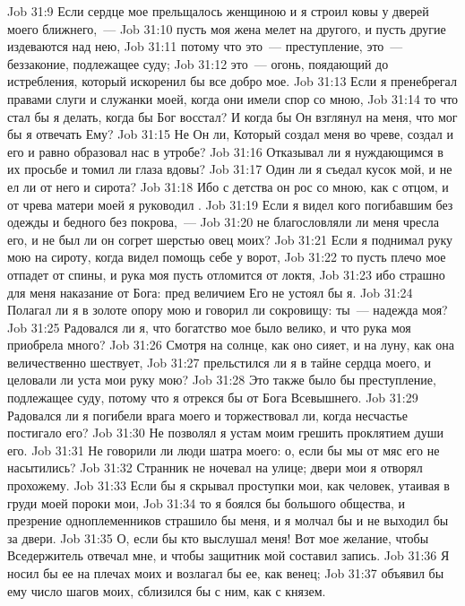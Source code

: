 \vs Job 31:9 Если сердце мое прельщалось женщиною и я строил ковы у дверей моего ближнего,~---
\vs Job 31:10 пусть моя жена мелет на другого, и пусть другие издеваются над нею,
\vs Job 31:11 потому что это~--- преступление, это~--- беззаконие, подлежащее суду;
\vs Job 31:12 это~--- огонь, поядающий до истребления, который искоренил бы все добро мое.
\vs Job 31:13 Если я пренебрегал правами слуги и служанки моей, когда они имели спор со мною,
\vs Job 31:14 то что стал бы я делать, когда бы Бог восстал? И когда бы Он взглянул на меня, что мог бы я отвечать Ему?
\vs Job 31:15 Не Он ли, Который создал меня во чреве, создал и его и равно образовал нас в утробе?
\vs Job 31:16 Отказывал ли я нуждающимся в их просьбе и томил ли глаза вдовы?
\vs Job 31:17 Один ли я съедал кусок мой, и не ел ли от него и сирота?
\vs Job 31:18 Ибо с детства он рос со мною, как с отцом, и от чрева матери моей я руководил .
\vs Job 31:19 Если я видел кого погибавшим без одежды и бедного без покрова,~---
\vs Job 31:20 не благословляли ли меня чресла его, и не был ли он согрет шерстью овец моих?
\vs Job 31:21 Если я поднимал руку мою на сироту, когда видел помощь себе у ворот,
\vs Job 31:22 то пусть плечо мое отпадет от спины, и рука моя пусть отломится от локтя,
\vs Job 31:23 ибо страшно для меня наказание от Бога: пред величием Его не устоял бы я.
\vs Job 31:24 Полагал ли я в золоте опору мою и говорил ли сокровищу: ты~--- надежда моя?
\vs Job 31:25 Радовался ли я, что богатство мое было велико, и что рука моя приобрела много?
\vs Job 31:26 Смотря на солнце, как оно сияет, и на луну, как она величественно шествует,
\vs Job 31:27 прельстился ли я в тайне сердца моего, и целовали ли уста мои руку мою?
\vs Job 31:28 Это также было бы преступление, подлежащее суду, потому что я отрекся бы  от Бога Всевышнего.
\vs Job 31:29 Радовался ли я погибели врага моего и торжествовал ли, когда несчастье постигало его?
\vs Job 31:30 Не позволял я устам моим грешить проклятием души его.
\vs Job 31:31 Не говорили ли люди шатра моего: о, если бы мы от мяс его не насытились?
\vs Job 31:32 Странник не ночевал на улице; двери мои я отворял прохожему.
\vs Job 31:33 Если бы я скрывал проступки мои, как человек, утаивая в груди моей пороки мои,
\vs Job 31:34 то я боялся бы большого общества, и презрение одноплеменников страшило бы меня, и я молчал бы и не выходил бы за двери.
\vs Job 31:35 О, если бы кто выслушал меня! Вот мое желание, чтобы Вседержитель отвечал мне, и чтобы защитник мой составил запись.
\vs Job 31:36 Я носил бы ее на плечах моих и возлагал бы ее, как венец;
\vs Job 31:37 объявил бы ему число шагов моих, сблизился бы с ним, как с князем.

